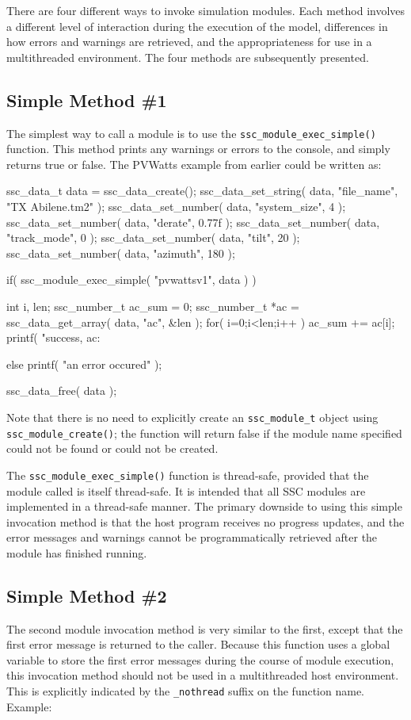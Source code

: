 \documentclass{article}
\begin{document}
There are four different ways to invoke simulation modules.  Each method involves a different level of interaction during the execution of the model, differences in how errors and warnings are retrieved, and the appropriateness for use in a multithreaded environment.  The four methods are subsequently presented.

\subsection{Simple Method \#1}

The simplest way to call a module is to use the \texttt{ssc\_module\_exec\_simple()} function.  This method prints any warnings or errors to the console, and simply returns true or false. The PVWatts example from earlier could be written as:

\begin{verbatimtab}[4]
ssc_data_t data = ssc_data_create();
ssc_data_set_string( data, "file_name", "TX Abilene.tm2" );
ssc_data_set_number( data, "system_size", 4 );
ssc_data_set_number( data, "derate", 0.77f );
ssc_data_set_number( data, "track_mode", 0 );
ssc_data_set_number( data, "tilt", 20 );
ssc_data_set_number( data, "azimuth", 180 );

if( ssc_module_exec_simple( "pvwattsv1", data ) )
{
	int i, len;
	ssc_number_t ac_sum = 0;
	ssc_number_t *ac = ssc_data_get_array( data, "ac", &len );
	for( i=0;i<len;i++ ) ac_sum += ac[i];
	printf( "success, ac: %

}
else
	printf( "an error occured\n" );

ssc_data_free( data );
\end{verbatimtab}

Note that there is no need to explicitly create an \texttt{ssc\_module\_t} object using \texttt{ssc\_module\_create()}; the function will return false if the module name specified could not be found or could not be created.

The \texttt{ssc\_module\_exec\_simple()} function is thread-safe, provided that the module called is itself thread-safe.  It is intended that all SSC modules are implemented in a thread-safe manner.  The primary downside to using this simple invocation method is that the host program receives no progress updates, and the error messages and warnings cannot be programmatically retrieved after the module has finished running.

\subsection{Simple Method \#2}
The second module invocation method is very similar to the first, except that the first error message is returned to the caller.  Because this function uses a global variable to store the first error messages during the course of module execution, this invocation method should not be used in a multithreaded host environment.  This is explicitly indicated by the \texttt{\_nothread} suffix on the function name.  Example:
\end{document}
